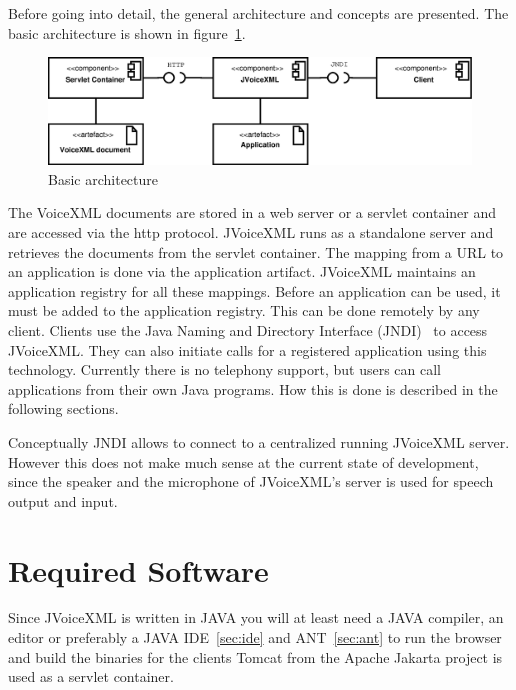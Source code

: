 \documentclass[11pt,a4paper]{article}
\begin{document}
Before going into detail, the general architecture and concepts are presented.
The basic architecture is shown in figure~\ref{fig:architecture}.

\begin{figure}
\label{fig:architecture}
\caption{Basic architecture}
\begin{center}
\includegraphics[scale=0.3]{architecture.eps}
\end{center}
\end{figure}

The VoiceXML documents are stored in a web server or a servlet container
and are accessed via the http protocol.
JVoiceXML runs as a standalone server and retrieves the documents from
the servlet container. The mapping from a URL to an application
is done via the application artifact. JVoiceXML maintains
an application registry for all these mappings. Before an application
can be used, it must be added to the application registry. This
can be done remotely by any client. Clients use the Java Naming 
and Directory Interface (JNDI)~\cite{sun:jndi} to access JVoiceXML.
They can also initiate calls for a registered application
using this technology. Currently there is no telephony support,
but users can call applications from their own Java programs.
How this is done is described in the following sections.

Conceptually JNDI allows to connect to a centralized running JVoiceXML
server. However this does not make much sense at the current state of
development, since the speaker and the microphone of JVoiceXML's server
is used for speech output and input.

\section{Required Software}
\label{sec:required-software}

Since JVoiceXML is written in JAVA you will at least need a
JAVA compiler, an editor or preferably a JAVA
IDE~\ref{sec:ide} and ANT~\ref{sec:ant} to run the browser and
build the binaries for the clients
Tomcat from the Apache Jakarta project is used as a servlet container.
\end{document}
